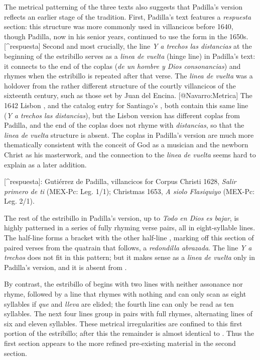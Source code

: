 The metrical patterning of the three texts also suggests that Padilla's version
reflects an earlier stage of the tradition.
First, Padilla's text features a \emph{respuesta} section: this structure was more
commonly used in villancicos before 1640, though Padilla, now in his senior
years, continued to use the form in the 1650s.[^respuesta]
Second and most crucially, the line \emph{Y a trechos las distancias} at the
beginning of the estribillo serves as a \emph{linea de vuelta} (hinge line) in
Padilla's text: it connects to the end of the coplas (\emph{de un hombre y Dios
consonancias}) and rhymes when the estribillo is repeated after that verse.
The \emph{linea de vuelta} was a holdover from the rather different structure of the
courtly villancicos of the sixteenth century, such as those set by Juan del
Encina.
[@Navarro:Metrica] %
The 1642 Lisbon , and the catalog entry for Santiago's , both
contain this same line (\emph{Y a trechos las distancias}), but the Lisbon version
has different coplas from Padilla, and the end of the coplas does not rhyme with
\emph{distancias}, so that the \emph{linea de vuelta} structure is absent.
The  coplas in Padilla's version are much more thematically consistent with
the conceit of God as a musician and the newborn Christ as his masterwork, and
the connection to the \emph{linea de vuelta} seems hard to explain as a later
addition.

[^respuesta]:
Gutiérrez de Padilla, villancicos for Corpus Christi 1628, \emph{Salir primero de ti}
(MEX-Pc: Leg. 1/1); Christmas 1653, \emph{A siolo Flasiquiyo} (MEX-Pc: Leg. 2/1).

The rest of the estribillo in Padilla's version, up to \emph{Todo en Dios es bajar},
is highly patterned in a series of fully rhyming verse pairs, all in
eight-syllable lines.
The half-line  forms a bracket with the other half-line , marking off this section of paired verses from the quatrain that
follows, a \emph{redondilla abrazada}.
The line \emph{Y a trechos} does not fit in this pattern; but it makes sense as a
\emph{linea de vuelta} only in Padilla's version, and it is absent from .

By contrast, the estribillo of  begins with two lines with neither
assonance nor rhyme, followed by a line that rhymes with nothing and can only
scan as eight syllables if \emph{que} and \emph{lleva} are elided; the fourth line can
only be read as ten syllables.
The next four lines group in pairs with full rhymes, alternating lines of six
and eleven syllables.
These metrical irregularities are confined to this first portion of the
estribillo; after this the remainder is almost identical to .
Thus the first section appears  to the more refined pre-existing
material in the second section.

